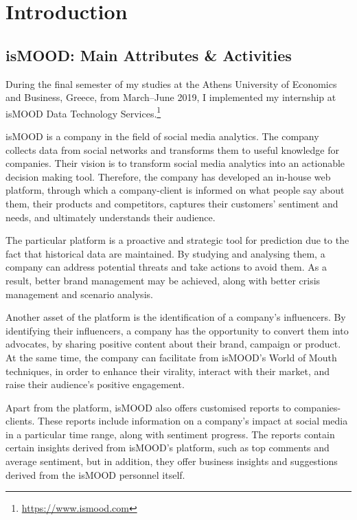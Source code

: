 \section{Introduction}
\label{sec:introduction}

\subsection{isMOOD: Main Attributes \& Activities}
\label{subsec:ismood}

During the final semester of my studies
at the Athens University of Economics and Business, Greece,
from March--June 2019,
I implemented my internship
at isMOOD Data Technology Services.\footnote{\url {https://www.ismood.com}}

isMOOD is a company in the field of social media analytics.
The company collects data from social networks
and transforms them to useful knowledge for companies.
Their vision is to transform social media analytics
into an actionable decision making tool.
Therefore, the company has developed an in-house web platform,
through which a company-client is informed
on what people say about them, their products and competitors,
captures their customers' sentiment and needs,
and ultimately understands their audience.

The particular platform is a proactive and strategic tool for prediction
due to the fact that historical data are maintained.
By studying and analysing them,
a company can address potential threats
and take actions to avoid them.
As a result, better brand management may be achieved,
along with better crisis management and scenario analysis.

Another asset of the platform is the identification
of a company's influencers.
By identifying their influencers,
a company has the opportunity
to convert them into advocates,
by sharing positive content about their brand, campaign or product.
At the same time, the company can facilitate 
from isMOOD's World of Mouth techniques,
in order to enhance their virality,
interact with their market,
and raise their audience's positive engagement.

Apart from the platform,
isMOOD also offers customised reports to companies-clients.
These reports include information on a company's impact
at social media in a particular time range,
along with sentiment progress.
The reports contain certain insights
derived from isMOOD's platform,
such as top comments and average sentiment,
but in addition,
they offer business insights and suggestions
derived from the isMOOD personnel itself.


